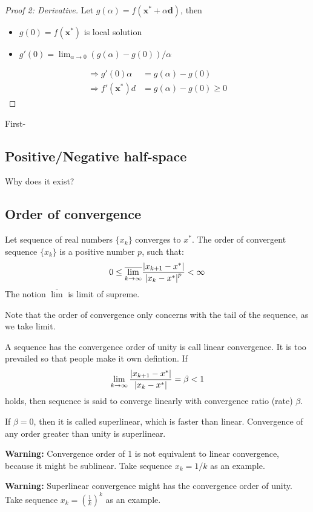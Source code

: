 \documentclass[11pt,a4paper]{article}
\begin{document}
\begin{proof}[Proof 2: Derivative]
    Let $g(\alpha) = f(\mathbf{x}^{*} + \alpha \mathbf{d})$, then
    \begin{itemize}
        \item $g(0) = f(\mathbf{x}^{*})$ is local solution
        \item $g'(0) = \lim_{\alpha \rightarrow 0}(g(\alpha) - g(0))/\alpha$
    \end{itemize}
    \begin{align}
        \Rightarrow g'(0) \alpha &= g(\alpha) - g(0) \\
        \Rightarrow f'(\mathbf{x}^{*})d &= g(\alpha) - g(0) \geq 0
    \end{align}
\end{proof}
\begin{lemma}
    First-
\end{lemma}
\begin{lemma}
    
\end{lemma}

\subsection{Positive/Negative half-space}%
\label{sub:positive_half_space}
Why does it exist?

\subsection{Order of convergence}%
\label{sub:order_of_convergence}
Let sequence of real numbers $\{x_k\}$ converges to $x^{*}$. The order of convergent sequence $\{x_k\}$ is a positive number $p$, such that:
\[
    0 \leq \overline{\lim_{k \rightarrow \infty}} \frac{\left\lvert x_{k+1}-x^{*}\right\rvert}{\left\lvert x_k - x^{*}\right\rvert^{p}} < \infty
\] 
The notion $\overline{\lim}$ is limit of supreme.

Note that the order of convergence only concerns with the tail of the sequence, as we take limit.

\begin{definition}
    A sequence has the convergence order of unity is call linear convergence. It is too prevailed so that people make it own defintion. If
    \[
        \lim_{k \rightarrow \infty} \frac{\left\lvert x_{k+1} - x^{*}\right\rvert}{\left\lvert x_k-x^{*}\right\rvert} = \beta < 1
    \] 
    holds, then sequence is said to converge linearly with convergence ratio (rate) $\beta$. 

    If $\beta = 0$, then it is called superlinear, which is faster than linear. Convergence of any order greater than unity is superlinear. 

    \textbf{Warning:} Convergence order of 1 is not equivalent to linear convergence, because it might be sublinear. Take sequence $x_k = 1/k$ as an example.


    \textbf{Warning:} Superlinear convergence might has the convergence order of unity. Take sequence $x_k = (\frac{1}{k})^{k}$ as an example.
\end{definition}
\end{document}
